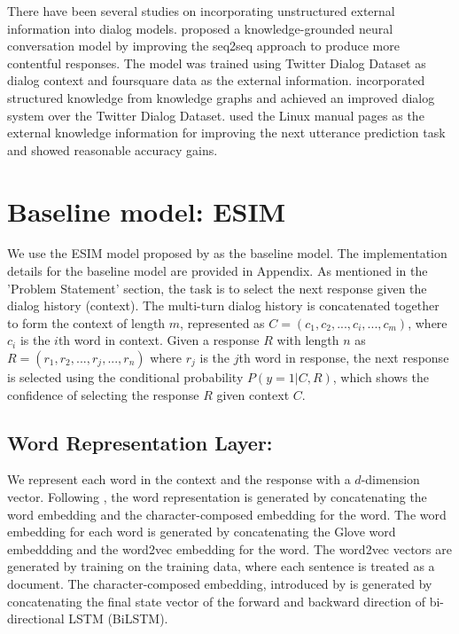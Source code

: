 \documentclass[letterpaper]{article} %
\begin{document}
There have been several studies on incorporating unstructured external information into dialog models. \citeauthor{ghazvininejad2017knowledge}  proposed a knowledge-grounded neural conversation model by improving the seq2seq approach to produce more contentful responses. The model was trained using Twitter Dialog Dataset \cite{li2016diversity} as dialog context and foursquare data as the external information. \citeauthor{young2017augmenting}  incorporated structured knowledge from knowledge graphs and achieved an improved dialog system over the Twitter Dialog Dataset.  \citeauthor{lowe2015incorporating}  used the Linux manual pages as the external knowledge information for improving the next utterance prediction task and showed reasonable accuracy gains.


\section{Baseline model: ESIM}
\label{baseline-model-esim}

We use the ESIM model proposed by \citeauthor{chen2017enhanced}  as the baseline model. The implementation details for the baseline model are provided in Appendix. As mentioned in the 'Problem Statement' section, the task is to select the next response given the dialog history (context). The multi-turn dialog history is concatenated together to form the context of length $m$, represented as $C = (c_1, c_2, ..., c_i, ..., c_m)$, where $c_i$ is the $i$th word in context. Given a response $R$ with length $n$ as $R = (r_1, r_2, ..., r_j, ..., r_n)$ where $r_j$ is the $j$th word in response, the next response is
selected using the conditional probability $P(y=1|C,R)$, which shows the confidence of selecting the response $R$ given context $C$.

\subsection{Word Representation Layer:}
We represent each word in the context and the response with a $d$-dimension vector. Following \citeauthor{dong2018enhance} , the word representation is generated by concatenating the word embedding and the character-composed embedding for the word.  The word embedding for each word is generated by concatenating the Glove word embeddding \cite{pennington2014glove} and the word2vec embedding \cite{mikolov2013efficient} for the word. The word2vec vectors are generated by training on the training data, where each sentence is treated as a document. The character-composed embedding, introduced by \cite{dong2018enhance} is generated by concatenating the final state vector of the forward and backward direction of bi-directional LSTM (BiLSTM).
\end{document}
